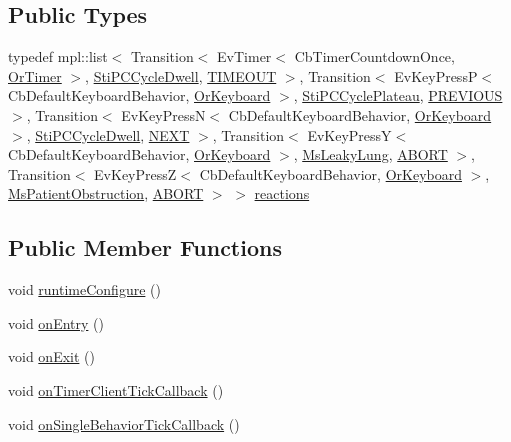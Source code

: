 \subsection*{Public Types}
\begin{DoxyCompactItemize}
\item 
typedef mpl\+::list$<$ Transition$<$ Ev\+Timer$<$ Cb\+Timer\+Countdown\+Once, \hyperlink{classsm__respira__1_1_1OrTimer}{Or\+Timer} $>$, \hyperlink{structsm__respira__1_1_1pc__cycle__inner__states_1_1StiPCCycleDwell}{Sti\+P\+C\+Cycle\+Dwell}, \hyperlink{structsm__respira__1_1_1pc__cycle__inner__states_1_1StiPCCycleExpire_1_1TIMEOUT}{T\+I\+M\+E\+O\+UT} $>$, Transition$<$ Ev\+Key\+PressP$<$ Cb\+Default\+Keyboard\+Behavior, \hyperlink{classsm__respira__1_1_1OrKeyboard}{Or\+Keyboard} $>$, \hyperlink{structsm__respira__1_1_1pc__cycle__inner__states_1_1StiPCCyclePlateau}{Sti\+P\+C\+Cycle\+Plateau}, \hyperlink{structsm__respira__1_1_1pc__cycle__inner__states_1_1StiPCCycleExpire_1_1PREVIOUS}{P\+R\+E\+V\+I\+O\+US} $>$, Transition$<$ Ev\+Key\+PressN$<$ Cb\+Default\+Keyboard\+Behavior, \hyperlink{classsm__respira__1_1_1OrKeyboard}{Or\+Keyboard} $>$, \hyperlink{structsm__respira__1_1_1pc__cycle__inner__states_1_1StiPCCycleDwell}{Sti\+P\+C\+Cycle\+Dwell}, \hyperlink{structsm__respira__1_1_1pc__cycle__inner__states_1_1StiPCCycleExpire_1_1NEXT}{N\+E\+XT} $>$, Transition$<$ Ev\+Key\+PressY$<$ Cb\+Default\+Keyboard\+Behavior, \hyperlink{classsm__respira__1_1_1OrKeyboard}{Or\+Keyboard} $>$, \hyperlink{classsm__respira__1_1_1MsLeakyLung}{Ms\+Leaky\+Lung}, \hyperlink{classABORT}{A\+B\+O\+RT} $>$, Transition$<$ Ev\+Key\+PressZ$<$ Cb\+Default\+Keyboard\+Behavior, \hyperlink{classsm__respira__1_1_1OrKeyboard}{Or\+Keyboard} $>$, \hyperlink{classsm__respira__1_1_1MsPatientObstruction}{Ms\+Patient\+Obstruction}, \hyperlink{classABORT}{A\+B\+O\+RT} $>$ $>$ \hyperlink{structsm__respira__1_1_1pc__cycle__inner__states_1_1StiPCCycleExpire_a54e6154636ad367cedb77d5fa782f4c4}{reactions}
\end{DoxyCompactItemize}
\subsection*{Public Member Functions}
\begin{DoxyCompactItemize}
\item 
void \hyperlink{structsm__respira__1_1_1pc__cycle__inner__states_1_1StiPCCycleExpire_a6fa2c541841c39b444f25fdd9b96f7b8}{runtime\+Configure} ()
\item 
void \hyperlink{structsm__respira__1_1_1pc__cycle__inner__states_1_1StiPCCycleExpire_ad5ee63b26397bf9c9b7388f01e2113a1}{on\+Entry} ()
\item 
void \hyperlink{structsm__respira__1_1_1pc__cycle__inner__states_1_1StiPCCycleExpire_ac95d0133d5ad8a49fb1a3a25f5eaa6ca}{on\+Exit} ()
\item 
void \hyperlink{structsm__respira__1_1_1pc__cycle__inner__states_1_1StiPCCycleExpire_a7fd642e0a6c10ef251fd3a6b8c8752ac}{on\+Timer\+Client\+Tick\+Callback} ()
\item 
void \hyperlink{structsm__respira__1_1_1pc__cycle__inner__states_1_1StiPCCycleExpire_a36833891f00ebabff74a5570627405a6}{on\+Single\+Behavior\+Tick\+Callback} ()
\end{DoxyCompactItemize}
